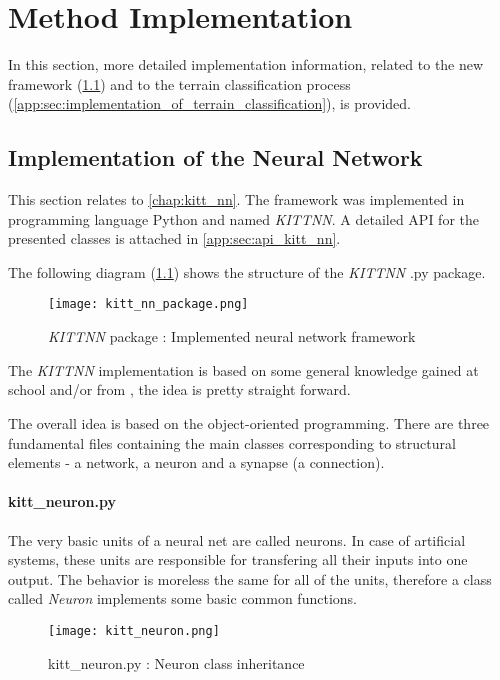 \chapter{Method Implementation} \label{app:implementation_details}
In this section, more detailed implementation information, related to the new framework (\cref{app:sec:implementation_of_nn}) and to the terrain classification process (\cref{app:sec:implementation_of_terrain_classification}), is provided.

\section{Implementation of the Neural Network} \label{app:sec:implementation_of_nn}
This section relates to \cref{chap:kitt_nn}. The framework was implemented in programming language Python and named \textit{KITTNN}. A detailed API for the presented classes is attached in \cref{app:sec:api_kitt_nn}.

The following diagram (\ref{img:kitt_nn_package}) shows the structure of the \textit{KITTNN} .py package.

\begin{figure}[H]
  \centering
  \texttt{[image: kitt\_nn\_package.png]}
  \caption{\textit{KITTNN} package : Implemented neural network framework}
  \label{img:kitt_nn_package}
\end{figure}

The \textit{KITTNN} implementation is based on some general knowledge gained at school and/or from \citep{online:nn_demystified}, the idea is pretty straight forward.

The overall idea is based on the object-oriented programming. There are three fundamental files containing the main classes corresponding to structural elements - a network, a neuron and a synapse (a connection).

\subsubsection*{kitt\_neuron.py} \label{ssec:kitt_neuron}
The very basic units of a neural net are called neurons. In case of artificial systems, these units are responsible for transfering all their inputs into one output. The behavior is moreless the same for all of the units, therefore a class called \textit{Neuron} implements some basic common functions.

\begin{figure}[H]
  \centering
  \texttt{[image: kitt\_neuron.png]}
  \caption{kitt\_neuron.py : Neuron class inheritance}
  \label{img:kitt_neuron}
\end{figure}

